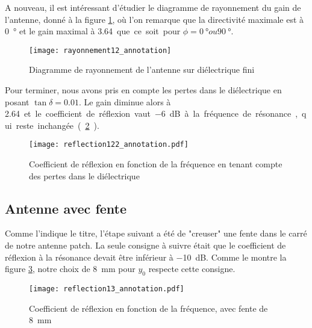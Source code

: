 A nouveau, il est intéressant d'étudier le diagramme de rayonnement du gain de l'antenne, donné à la figure \ref{fig:rayonnement12_annotation}, où l'on remarque que la directivité maximale est à  \SI{0}{\degree} et le gain maximal à \SI{3.64} que ce soit pour $\phi = \SI{0}{\degree} ou  \SI{90}{\degree}$.
\begin{figure}
\centering
\texttt{[image: rayonnement12\_annotation]}
\caption{Diagramme de rayonnement de l'antenne sur diélectrique fini}
\label{fig:rayonnement12_annotation}
\end{figure}
Pour terminer, nous avons pris en compte les pertes dans le diélectrique en posant $\tan{\delta} = 0.01$. Le gain diminue alors à \SI{2.64} et le coefficient de réflexion vaut \SI{-6}{\deci\bel} à la fréquence de résonance, qui reste inchangée. (\ref{fig:reflection122_annotation}).
\begin{figure}[htbp]
\centering
\texttt{[image: reflection122\_annotation.pdf]}
\caption{Coefficient de réflexion en fonction de la fréquence en tenant compte des pertes dans le diélectrique}
\label{fig:reflection122_annotation}
\end{figure}


\subsection{Antenne avec fente}
Comme l'indique le titre, l'étape suivant a été de "creuser" une fente dans le carré de notre antenne patch. La seule consigne à suivre était que le coefficient de réflexion à la résonance devait être inférieur à \SI{-10}{\deci\bel}. Comme le montre la figure \ref{fig:reflection13_annotation}, notre choix de \SI{8}{\milli\meter} pour $y_0$ respecte cette consigne.
\begin{figure}[htbp]
\centering
\texttt{[image: reflection13\_annotation.pdf]}
\caption{Coefficient de réflexion en fonction de la fréquence, avec fente de \SI{8}{\milli\meter}}
\label{fig:reflection13_annotation}
\end{figure}

